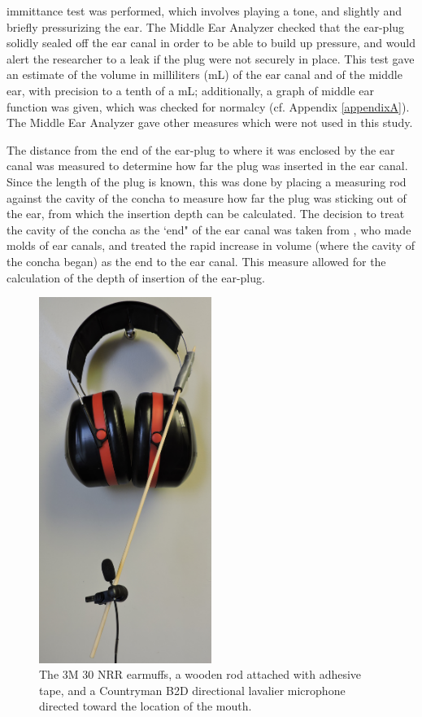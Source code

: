 \DIFaddend immittance test was performed, which involves playing a tone, and slightly and briefly pressurizing the ear.  The Middle Ear Analyzer checked that the ear-plug solidly sealed off the ear canal in order to be able to build up pressure, and would alert the researcher to a leak if the plug were not securely in place.  This test gave an estimate of the volume in milliliters (mL) of the ear canal and of the middle ear, with precision to a tenth of a mL; additionally, a graph of middle ear function was given, which was checked for normalcy (cf. Appendix \DIFdelbegin {}\DIFdelend \ref{appendixA}).  The Middle Ear Analyzer gave other measures which were not used in this study.

The distance from the end of the ear-plug to where it was enclosed by the ear canal was measured to determine how far the plug was inserted in the ear canal.
Since the length of the plug is known, this was done by placing a measuring rod against the cavity of the concha to measure how far the plug was sticking out of the ear, from which the insertion depth can be calculated. The decision to treat the cavity of the concha as the `end" of the ear canal was taken from \cite{stenfelt:07}, who made molds of ear canals, and treated the rapid increase in volume (where the cavity of the concha began) as the end to the ear canal.  This measure allowed for the calculation of the depth of insertion of the ear-plug.

\begin{figure}
\includegraphics[width=0.5\textwidth]{figure/earmuffSetup.JPG}
\caption{The 3M 30 NRR earmuffs, a wooden rod attached with adhesive tape, and a Countryman B2D directional lavalier microphone directed toward the location of the mouth.}
\label{fig:micInsertPlug}
\end{figure}

